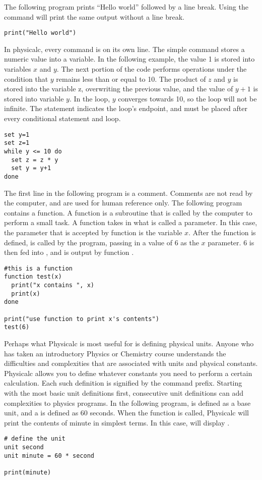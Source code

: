 The following program prints ``Hello world'' followed by a line
break. Using the  command will print the same output without a
line break.

\begin{verbatim}
print("Hello world")
\end{verbatim}

In physicalc, every command is on its own line. The simple 
command stores a numeric value into a variable. In the following
example, the value 1 is stored into variables $x$ and $y$. The
next portion of the code performs operations under the condition that
$y$ remains less than or equal to 10. The product of $z$ and $y$ is
stored into the variable z, overwriting the previous value, and the
value of $y + 1$ is stored into variable $y$. In the loop, $y$ converges
towards 10, so the loop will not be infinite. The  statement
indicates the loop's endpoint, and must be placed after every
conditional statement and loop.

\begin{verbatim}
set y=1
set z=1
while y <= 10 do
  set z = z * y
  set y = y+1
done
\end{verbatim}

The first line in the following program is a comment. Comments are not
read by the computer, and are used for human reference only. The
following program contains a function. A function is a subroutine that
is called by the computer to perform a small task. A function takes in
what is called a parameter. In this case, the parameter that is
accepted by function  is the variable $x$. After the function is
defined,  is called by the program, passing in a value of 6
as the $x$ parameter. 6 is then fed into , and is output by
function .

\begin{verbatim}
#this is a function
function test(x)
  print("x contains ", x)
  print(x)
done

print("use function to print x's contents")
test(6)
\end{verbatim}

 

Perhaps what Physicalc is most useful for is defining physical
units. Anyone who has taken an introductory Physics or Chemistry
course understands the difficulties and complexities that are
associated with units and physical constants. Physicalc allows you to
define whatever constants you need to perform a certain
calculation. Each such definition is signified by the  command
prefix. Starting with the most basic unit definitions first,
consecutive unit definitions can add complexities to physics
programs. In the following program,  is defined as a base unit,
and a  is defined as 60 seconds. When the  function is
called, Physicalc will print the contents of minute in simplest
terms. In this case,  will display .
 

\begin{verbatim}
# define the unit
unit second
unit minute = 60 * second

print(minute)
\end{verbatim}
